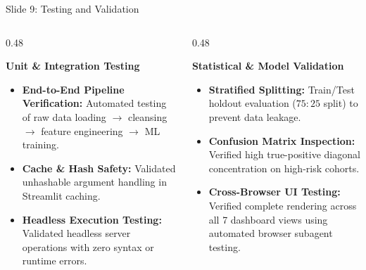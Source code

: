 \documentclass[10pt, aspectratio=169]{beamer}
\begin{document}
\begin{frame}{Slide 9: Testing and Validation}
    \begin{columns}[T]
        \begin{column}{0.48\textwidth}
            \begin{block}{\textbf{Unit \& Integration Testing}}
                \begin{itemize}
                    \item \textbf{End-to-End Pipeline Verification:} Automated testing of raw data loading $\rightarrow$ cleansing $\rightarrow$ feature engineering $\rightarrow$ ML training.
                    \item \textbf{Cache \& Hash Safety:} Validated unhashable argument handling in Streamlit caching.
                    \item \textbf{Headless Execution Testing:} Validated headless server operations with zero syntax or runtime errors.
                \end{itemize}
            \end{block}
        \end{column}
        \begin{column}{0.48\textwidth}
            \begin{block}{\textbf{Statistical \& Model Validation}}
                \begin{itemize}
                    \item \textbf{Stratified Splitting:} Train/Test holdout evaluation ($75:25$ split) to prevent data leakage.
                    \item \textbf{Confusion Matrix Inspection:} Verified high true-positive diagonal concentration on high-risk cohorts.
                    \item \textbf{Cross-Browser UI Testing:} Verified complete rendering across all 7 dashboard views using automated browser subagent testing.
                \end{itemize}
            \end{block}
        \end{column}
    \end{columns}
\end{frame}
\end{document}
